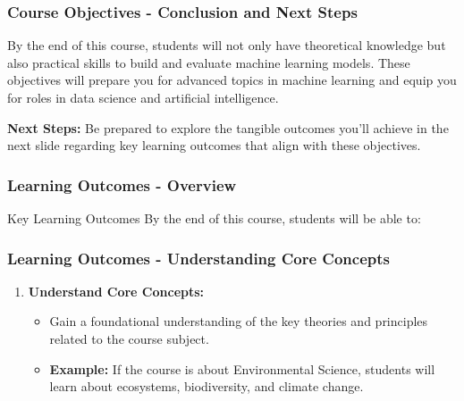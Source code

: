 \documentclass[aspectratio=169]{beamer}
\begin{document}
\begin{frame}[fragile]
    \frametitle{Course Objectives - Conclusion and Next Steps}
    By the end of this course, students will not only have theoretical knowledge but also practical skills to build and evaluate machine learning models.
    These objectives will prepare you for advanced topics in machine learning and equip you for roles in data science and artificial intelligence.

    \textbf{Next Steps:} 
    Be prepared to explore the tangible outcomes you'll achieve in the next slide regarding key learning outcomes that align with these objectives.
\end{frame}

\begin{frame}[fragile]
    \frametitle{Learning Outcomes - Overview}
    \begin{block}{Key Learning Outcomes}
        By the end of this course, students will be able to:
    \end{block}
\end{frame}

\begin{frame}[fragile]
    \frametitle{Learning Outcomes - Understanding Core Concepts}
    \begin{enumerate}
        \item \textbf{Understand Core Concepts:}
        \begin{itemize}
            \item Gain a foundational understanding of the key theories and principles related to the course subject. 
            \item \textbf{Example:} If the course is about Environmental Science, students will learn about ecosystems, biodiversity, and climate change.
        \end{itemize}
    \end{enumerate}
\end{frame}
\end{document}
